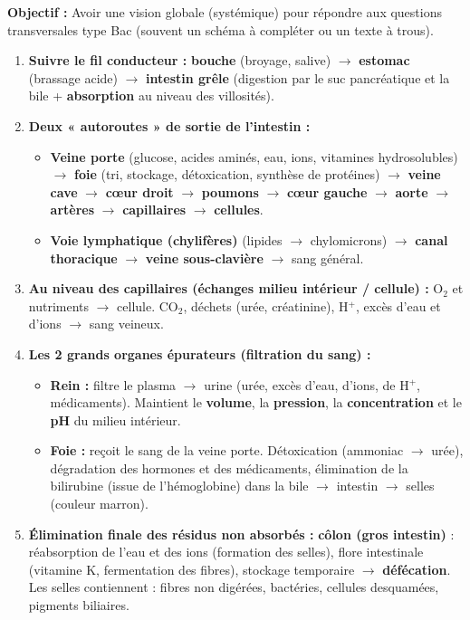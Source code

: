 \documentclass[11pt]{article}
\begin{document}
\begin{methode}
    \textbf{Objectif :} Avoir une vision globale (systémique) pour répondre aux questions transversales type Bac (souvent un schéma à compléter ou un texte à trous).
    \begin{enumerate}
        \item \textbf{Suivre le fil conducteur :} \textbf{bouche} (broyage, salive) $\rightarrow$ \textbf{estomac} (brassage acide) $\rightarrow$ \textbf{intestin grêle} (digestion par le suc pancréatique et la bile + \textbf{absorption} au niveau des villosités).
        \item \textbf{Deux « autoroutes » de sortie de l'intestin :}
            \begin{itemize}
                \item \textbf{Veine porte} (glucose, acides aminés, eau, ions, vitamines hydrosolubles) $\rightarrow$ \textbf{foie} (tri, stockage, détoxication, synthèse de protéines) $\rightarrow$ \textbf{veine cave} $\rightarrow$ \textbf{cœur droit} $\rightarrow$ \textbf{poumons} $\rightarrow$ \textbf{cœur gauche} $\rightarrow$ \textbf{aorte} $\rightarrow$ \textbf{artères} $\rightarrow$ \textbf{capillaires} $\rightarrow$ \textbf{cellules}.
                \item \textbf{Voie lymphatique (chylifères)} (lipides $\rightarrow$ chylomicrons) $\rightarrow$ \textbf{canal thoracique} $\rightarrow$ \textbf{veine sous-clavière} $\rightarrow$ sang général.
            \end{itemize}
        \item \textbf{Au niveau des capillaires (échanges milieu intérieur / cellule) :} O$_2$ et nutriments $\rightarrow$ cellule. CO$_2$, déchets (urée, créatinine), H$^+$, excès d'eau et d'ions $\rightarrow$ sang veineux.
        \item \textbf{Les 2 grands organes épurateurs (filtration du sang) :}
            \begin{itemize}
                \item \textbf{Rein :} filtre le plasma $\rightarrow$ urine (urée, excès d'eau, d'ions, de H$^+$, médicaments). Maintient le \textbf{volume}, la \textbf{pression}, la \textbf{concentration} et le \textbf{pH} du milieu intérieur.
                \item \textbf{Foie :} reçoit le sang de la veine porte. Détoxication (ammoniac $\rightarrow$ urée), dégradation des hormones et des médicaments, élimination de la bilirubine (issue de l'hémoglobine) dans la bile $\rightarrow$ intestin $\rightarrow$ selles (couleur marron).
            \end{itemize}
        \item \textbf{Élimination finale des résidus non absorbés :} \textbf{côlon (gros intestin)} : réabsorption de l'eau et des ions (formation des selles), flore intestinale (vitamine K, fermentation des fibres), stockage temporaire $\rightarrow$ \textbf{défécation}. Les selles contiennent : fibres non digérées, bactéries, cellules desquamées, pigments biliaires.
    \end{enumerate}
\end{methode}
\end{document}
